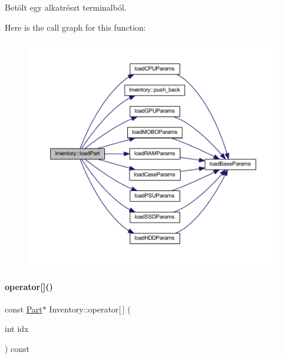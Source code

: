 Betölt egy alkatrészt terminalból. 

Here is the call graph for this function\+:
\nopagebreak
\begin{figure}[H]
\begin{center}
\leavevmode
\includegraphics[width=350pt]{class_inventory_a9dd64f268a7a5cca611b5f749ec33f96_cgraph}
\end{center}
\end{figure}
\mbox{\label{class_inventory_a99b8be25beb3530c47d1faa913633979}} 
\paragraph{\texorpdfstring{operator[]()}{operator[]()}\hspace{0.1cm}{\footnotesize\ttfamily [1/2]}}
{\footnotesize\ttfamily const \mbox{\hyperlink{class_part}{Part}}$\ast$ Inventory\+::operator\mbox{[}$\,$\mbox{]} (\begin{DoxyParamCaption}\item[{int}]{idx }\end{DoxyParamCaption}) const\hspace{0.3cm}{\ttfamily [inline]}}

\mbox{\label{class_inventory_a86601b8ee999e78cdeea83431bab8f33}} 
